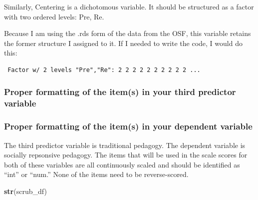 \documentclass[
  11pt,
]{book}
\newenvironment{Shaded}{\begin{snugshade}}{\end{snugshade}}
\newcommand{\AttributeTok}[1]{\textcolor[rgb]{0.27,0.27,0.27}{#1}}
\newcommand{\FunctionTok}[1]{\textcolor[rgb]{0.27,0.27,0.27}{\textbf{#1}}}
\newcommand{\NormalTok}[1]{#1}
\newcommand{\OtherTok}[1]{\textcolor[rgb]{0.37,0.37,0.37}{#1}}
\newcommand{\SpecialCharTok}[1]{\textcolor[rgb]{0.43,0.43,0.43}{\textbf{#1}}}
\newcommand{\StringTok}[1]{\textcolor[rgb]{0.5,0.5,0.5}{#1}}
\begin{document}
Similarly, Centering is a dichotomous variable. It should be structured as a factor with two ordered levels: Pre, Re.

Because I am using the .rds form of the data from the OSF, this variable retains the former structure I assigned to it. If I needed to write the code, I would do this:

\begin{Shaded}
\end{Shaded}

\begin{verbatim}
 Factor w/ 2 levels "Pre","Re": 2 2 2 2 2 2 2 2 2 2 ...
\end{verbatim}

\hypertarget{proper-formatting-of-the-items-in-your-third-predictor-variable}{%
\subsubsection*{Proper formatting of the item(s) in your third predictor variable}\label{proper-formatting-of-the-items-in-your-third-predictor-variable}}


\hypertarget{proper-formatting-of-the-items-in-your-dependent-variable}{%
\subsubsection*{Proper formatting of the item(s) in your dependent variable}\label{proper-formatting-of-the-items-in-your-dependent-variable}}


The third predictor variable is traditional pedagogy. The dependent variable is socially repsonsive pedagogy. The items that will be used in the scale scores for both of these variables are all continuously scaled and should be identified as ``int'' or ``num.'' None of the items need to be reverse-scored.

\begin{Shaded}
\begin{Highlighting}[]
\FunctionTok{str}\NormalTok{(scrub\_df)}
\end{Highlighting}
\end{Shaded}
\end{document}
